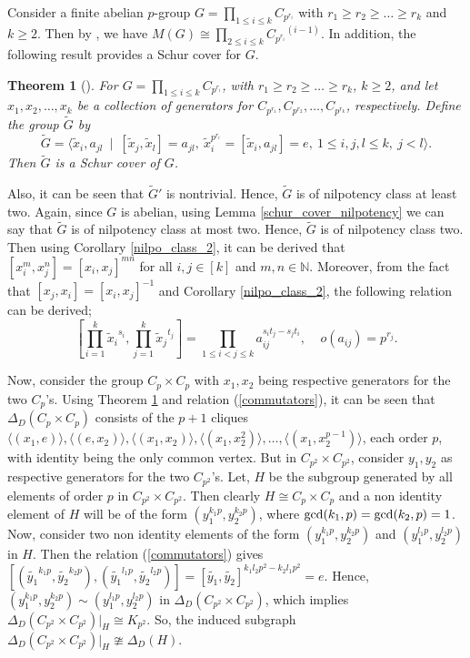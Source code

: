 \documentclass[12pt,a4paper]{article}
\newtheorem{theorem}{Theorem}[section]
\begin{document}
Consider a finite abelian $p$-group $G=\prod_{1\leq i \leq k}C_{p^{r_i}}$ with $r_1\geq r_2\geq \dots \geq r_k$ and $k\geq 2$. Then by \cite[Corollary 2.2.12]{karpi}, we have $M(G)\cong\prod_{2\leq i \leq k}{C_{p^{r_i}}}^{(i-1)}$. In addition, the following result provides a Schur cover for $G$.
\begin{theorem}[{\rm\cite[Theorem 2.9.3]{karpi}}]\label{Cover_abelian_p}
For $G=\prod_{1\leq i \leq k}C_{p^{r_i}}$, with $r_1\geq r_2\geq \dots \geq r_k$, $k\geq 2$, and let $x_1, x_2, \dots, x_k$ be a collection of generators for $C_{p^{r_1}},C_{p^{r_2}},\dots,C_{p^{r_k}}$, respectively. Define the group $\tilde{G}$ by
\[
\tilde{G}=\langle \tilde{x}_i, a_{jl}~\mid~[\tilde{x}_j, \tilde{x}_l]=a_{jl},~  \tilde{x}_i^{p^{r_i}}=[\tilde{x}_i,a_{jl}]=e,~1\leq i,j,l \leq k,~j<l \rangle.
\]
Then $\tilde{G}$ is a Schur cover of $G$.
\end{theorem}
Also, it can be seen that $\tilde{G}'$ is nontrivial. Hence, $\tilde{G}$ is of nilpotency class at least two. Again, since $G$ is abelian, using Lemma \ref{schur_cover_nilpotency} we can say that $\tilde{G}$ is of nilpotency class at most two. Hence, $\tilde{G}$ is of nilpotency class two. Then using Corollary \ref{nilpo_class_2}, it can be derived that $[x_i^m,x_j^n]=[x_i,x_j]^{mn}$ for all $i,j\in [k]$ and $m,n\in\mathbb{N}$. Moreover, from the fact that $[x_j,x_i]=[x_i,x_j]^{-1}$ and Corollary \ref{nilpo_class_2}, the following relation can be derived; 
\begin{equation}\label{commutators}
\left[\prod_{i=1}^k {\tilde{x}_i}^{s_i}, \prod_{j=1}^k {\tilde{x}_j}^{t_j}\right]=\prod_{1 \leq i<j \leq k}a_{ij}^{s_it_j-s_jt_i},~~~~~o(a_{ij})=p^{r_j}.
\end{equation}

Now, consider the group $C_p\times C_p$ with $x_1,x_2$ being respective generators for the two $C_p$'s. Using Theorem \ref{Cover_abelian_p} and relation (\ref{commutators}), it can be seen that $\Delta_D(C_p\times C_p)$ consists of the $p+1$ cliques $\langle(x_1,e)\rangle,\langle(e,x_2)\rangle,\langle(x_1,x_2)\rangle,\langle(x_1,x_2^2)\rangle,\dots,\langle(x_1,x_2^{p-1})\rangle$, each order $p$, with identity being the only common vertex. But in $C_{p^2}\times C_{p^2}$, consider $y_1,y_2$ as respective generators for the two $C_{p^2}$'s. Let, $H$ be the subgroup generated by all elements of order $p$ in $C_{p^2}\times C_{p^2}$. Then clearly $H\cong C_p\times C_p$ and a non identity element of $H$ will be of the form $(y_1^{k_1p},y_2^{k_2p})$, where ${\rm gcd}(k_1,p)={\rm gcd}(k_2,p)=1$. Now, consider two non identity elements of the form $(y_1^{k_1p},y_2^{k_2p})$ and $(y_1^{l_1p},y_2^{l_2p})$ in $H$. Then the relation (\ref{commutators}) gives $[(\tilde{y_1}^{k_1p},\tilde{y_2}^{k_2p}),(\tilde{y_1}^{l_1p},\tilde{y_2}^{l_2p})]=[\tilde{y_1},\tilde{y_2}]^{k_1l_2p^2-k_2l_1p^2}=e$. Hence, $(y_1^{k_1p},y_2^{k_2p})\sim(y_1^{l_1p},y_2^{l_2p})$ in $\Delta_D(C_{p^2}\times C_{p^2})$, which implies $\Delta_D(C_{p^2}\times C_{p^2})\vert_H\cong K_{p^2}$. So, the induced subgraph $\Delta_D(C_{p^2}\times C_{p^2})\vert_H\ncong \Delta_D(H)$.
\end{document}
